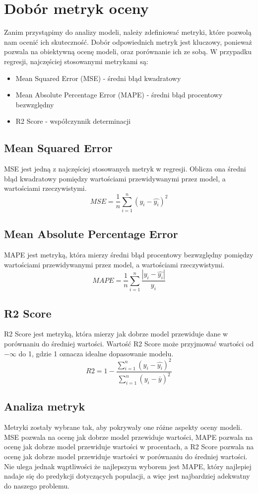 \documentclass[11pt]{article}
\begin{document}
\section{Dobór metryk oceny}
Zanim przystąpimy do analizy modeli, należy zdefiniować metryki, które pozwolą nam ocenić ich skuteczność.
Dobór odpowiednich metryk jest kluczowy, ponieważ pozwala na obiektywną ocenę modeli, oraz porównanie ich ze sobą.
W przypadku regresji, najczęściej stosowanymi metrykami są:
\begin{itemize}
\item Mean Squared Error (MSE) - średni błąd kwadratowy
\item Mean Absolute Percentage Error (MAPE) - średni błąd procentowy bezwzględny
\item R2 Score - współczynnik determinacji
\end{itemize}
\subsection*{Mean Squared Error}
MSE jest jedną z najczęściej stosowanych metryk w regresji. Oblicza ona średni błąd kwadratowy pomiędzy wartościami przewidywanymi przez model, a wartościami rzeczywistymi.
\begin{equation}
MSE = \frac{1}{n} \sum_{i=1}^{n} (y_i - \hat{y_i})^2
\end{equation}
\subsection*{Mean Absolute Percentage Error}
MAPE jest metryką, która mierzy średni błąd procentowy bezwzględny pomiędzy wartościami przewidywanymi przez model, a wartościami rzeczywistymi.
\begin{equation}
MAPE = \frac{1}{n} \sum_{i=1}^{n} \frac{|y_i - \hat{y_i}|}{y_i}
\end{equation}
\subsection*{R2 Score}
R2 Score jest metryką, która mierzy jak dobrze model przewiduje dane w porównaniu do średniej wartości. Wartość R2 Score może przyjmować wartości od $-\infty$
  do 1, gdzie 1 oznacza idealne dopasowanie modelu.
\begin{equation}
R2 = 1 - \frac{\sum_{i=1}^{n} (y_i - \hat{y_i})^2}{\sum_{i=1}^{n} (y_i - \bar{y})^2}
\end{equation}
\subsection*{Analiza metryk}
Metryki zostały wybrane tak, aby pokrywały one różne aspekty oceny modeli. MSE pozwala na ocenę jak dobrze model przewiduje wartości, MAPE pozwala na ocenę jak dobrze model przewiduje wartości w procentach, a R2 Score pozwala na ocenę jak dobrze model przewiduje wartości w porównaniu do średniej wartości.
Nie ulega jednak wąptliwości że najlepszym wyborem jest MAPE, który najlepiej nadaje się do predykcji dotyczących populacji\cite{dop}, a więc jest najbardziej adekwatny do naszego problemu.
\end{document}

